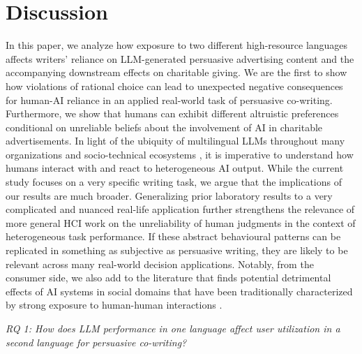 \section{Discussion}
In this paper, we analyze how exposure to two different high-resource languages affects writers' reliance on LLM-generated persuasive advertising content and the accompanying downstream effects on charitable giving. We are the first to show how violations of rational choice can lead to unexpected negative consequences for human-AI reliance in an applied real-world task of persuasive co-writing. Furthermore, we show that humans can exhibit different altruistic preferences conditional on unreliable beliefs about the involvement of AI in charitable advertisements. In light of the ubiquity of multilingual LLMs throughout many organizations and socio-technical ecosystems \cite{wang2023mathcoder, luo2024integration, weber2024large, arora2024analyzing}, it is imperative to understand how humans interact with and react to heterogeneous AI output. While the current study focuses on a very specific writing task, we argue that the implications of our results are much broader. Generalizing prior laboratory results to a very complicated and nuanced real-life application further strengthens the relevance of more general HCI work on the unreliability of human judgments in the context of heterogeneous task performance. If these abstract behavioural patterns can be replicated in something as subjective as persuasive writing, they are likely to be relevant across many real-world decision applications. 
Notably, from the consumer side, we also add to the literature that finds potential detrimental effects of  AI systems in social domains that have been traditionally characterized by strong exposure to human-human interactions \cite{lim2024effect, grassini2024understanding, shank2023ai}. 




\vspace{.5em}
\noindent
\textit{RQ 1: How does LLM performance in one language affect user utilization in a second language for persuasive co-writing?}
\vspace{.5em}


